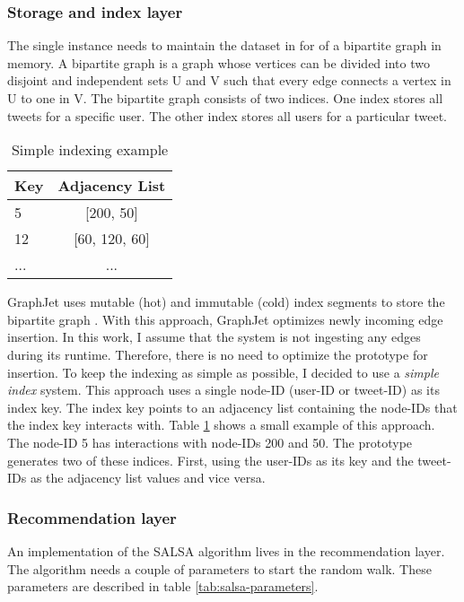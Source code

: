 
\subsubsection{Storage and index layer}
\label{subsub:storage-index-layer}
The single instance needs to maintain the dataset in for of a bipartite graph in memory. A bipartite graph is a graph whose vertices can be divided into two disjoint and independent sets U and V such that every edge connects a vertex in U to one in V. The bipartite graph consists of two indices. One index stores all tweets for a specific user. The other index stores all users for a particular tweet.

\begin{table}[!h]
    \centering
    \caption{Simple indexing example}
    \label{tab:simple-indexing}
    \begin{tabular}{|l|c|}
        \hline
        \textbf{Key} & \textbf{Adjacency List} \\
        \hline
        5 & [200, 50] \\
        \hline
        12 & [60, 120, 60] \\
        \hline
        ... & ... \\
        \hline
    \end{tabular}
\end{table}


GraphJet uses mutable (hot) and immutable (cold) index segments to store the bipartite graph \cite{sharmaGraphJetRealtimeContent2016}. With this approach, GraphJet optimizes newly incoming edge insertion. In this work, I assume that the system is not ingesting any edges during its runtime. Therefore, there is no need to optimize the prototype for insertion. To keep the indexing as simple as possible, I decided to use a \emph{simple index} system. This approach uses a single node-ID (user-ID or tweet-ID) as its index key. The index key points to an adjacency list containing the node-IDs that the index key interacts with. Table \ref{tab:simple-indexing} shows a small example of this approach. The node-ID 5 has interactions with node-IDs 200 and 50. The prototype generates two of these indices. First, using the user-IDs as its key and the tweet-IDs as the adjacency list values and vice versa.


\subsubsection{Recommendation layer}
\label{subsubsec:recommendation-layer}
An implementation of the SALSA \cite{lempelSALSAStochasticApproach2001} algorithm lives in the recommendation layer. The algorithm needs a couple of parameters to start the random walk. These parameters are described in table \ref{tab:salsa-parameters}.


